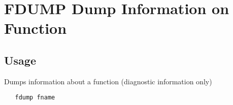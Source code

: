 \section{FDUMP Dump Information on Function}

\subsection{Usage}

Dumps information about a function (diagnostic information only)
\begin{verbatim}
   fdump fname
\end{verbatim}
